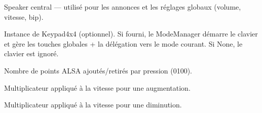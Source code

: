 \documentclass[letterpaper,10pt,french]{sphinxmanual}
\begin{document}
\begin{fulllineitems}
\begin{description}
\sphinxAtStartPar
Speaker central — utilisé pour les annonces et les réglages
globaux (volume, vitesse, bip).

\sphinxAtStartPar
Instance de Keypad4x4 (optionnel). Si fourni, le ModeManager
démarre le clavier et gère les touches globales + la délégation
vers le mode courant. Si None, le clavier est ignoré.

\sphinxAtStartPar
Nombre de points ALSA ajoutés/retirés par pression (0\textendash{}100).

\sphinxAtStartPar
Multiplicateur appliqué à la vitesse pour une augmentation.

\sphinxAtStartPar
Multiplicateur appliqué à la vitesse pour une diminution.

\end{description}

\begin{fulllineitems}
\label{\detokenize{api/core:core.mode_manager.ModeManager.KEY_GLOBAL_VOL_UP}}
\pysigstartsignatures
\pysigline
{}
\pysigstopsignatures
\end{fulllineitems}


\begin{fulllineitems}
\label{\detokenize{api/core:core.mode_manager.ModeManager.KEY_GLOBAL_VOL_DOWN}}
\pysigstartsignatures
\pysigline
{}
\pysigstopsignatures
\end{fulllineitems}


\begin{fulllineitems}
\label{\detokenize{api/core:core.mode_manager.ModeManager.KEY_GLOBAL_SPEED_UP}}
\pysigstartsignatures
\pysigline
{}
\pysigstopsignatures
\end{fulllineitems}


\end{fulllineitems}
\end{document}
